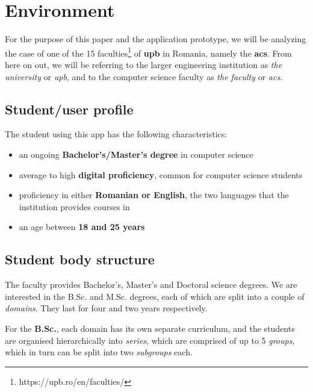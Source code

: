 \section{Environment} \label{1:environment}

    For the purpose of this paper and the application prototype, we will be analyzing the case of one of the 15 faculties\footnote{https://upb.ro/en/faculties/} of \textbf{\acrlong{upb}} in Romania, namely the \textbf{\acrlong{acs}}. From here on out, we will be referring to the larger engineering institution as \textit{the university} or \textit{\acrshort{upb}}, and to the computer science faculty as \textit{the faculty} or \textit{\acrshort{acs}}.
    
    \subsection{Student/user profile} \label{2:student_profile}
    
        The student using this app has the following characteristics:
        \begin{itemize}
            \item an ongoing \textbf{Bachelor's/Master's degree} in computer science
            \item average to high \textbf{digital proficiency}, common for computer science students%
            \item proficiency in either \textbf{Romanian or English}, the two languages that the institution provides courses in%
            \item an age between \textbf{18 and 25 years}
        \end{itemize}
        
    \subsection{Student body structure} \label{1:student_body_structure}
    
        The faculty provides Bachelor's, Master's and Doctoral science degrees. We are interested in the B.Sc. and M.Sc. degrees, each of which are split into a couple of \textit{domains}. They last for four and two years respectively.
        
        For the \textbf{B.Sc.}, each domain has its own separate curriculum, and the students are organised hierarchically into \textit{series}, which are comprised of up to 5 \textit{groups}, which in turn can be split into two \textit{subgroups} each.
        
